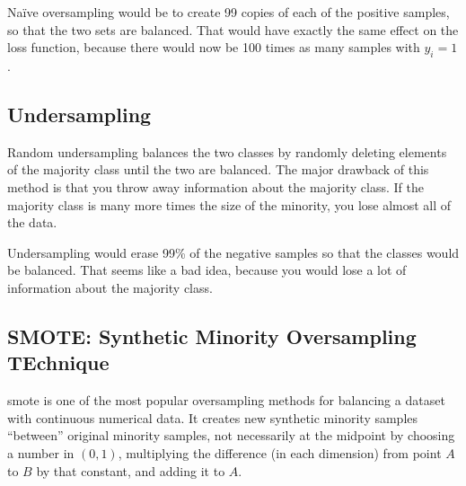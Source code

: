 Na\"{i}ve oversampling would be to create 99 copies of each of the positive samples, so that the two sets are balanced.  That would have exactly the same effect on the loss function, because there would now be 100 times as many samples with $y_i=1$.  


\subsection{Undersampling}

Random undersampling balances the two classes by randomly deleting elements of the majority class until the two are balanced.  The major drawback of this method is that you throw away information about the majority class.  If the majority class is many more times the size of the minority, you lose almost all of the data.  


\begin{center}
\end{center}


Undersampling would erase 99\% of the negative samples so that the classes would be balanced.  That seems like a bad idea, because you would lose a lot of information about the majority class.  

\subsection{SMOTE:  Synthetic Minority Oversampling TEchnique}

\acrfull{smote} \cite{00017602530000120020101} is one of the most popular oversampling methods for balancing a dataset with continuous numerical data.  It creates new synthetic minority samples ``between'' original minority samples, not necessarily at the midpoint by choosing a number in $(0,1)$, multiplying the difference (in each dimension) from point $A$ to $B$ by that constant, and adding it to $A$.

